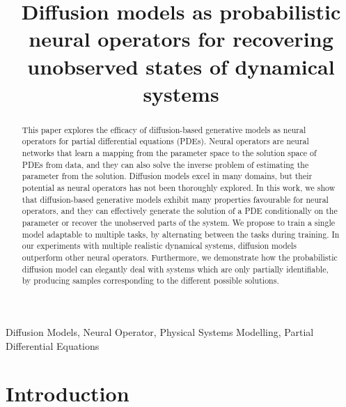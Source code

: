 \documentclass{article}
\title{Diffusion models as probabilistic neural operators for recovering unobserved states of dynamical systems}
\begin{document}
\maketitle

\begin{abstract}

This paper explores the efficacy of diffusion-based generative models as neural operators for partial differential equations (PDEs). Neural operators are neural networks that learn a mapping from the parameter space to the solution space of PDEs from data, and they can also solve the inverse problem of estimating the parameter from the solution. Diffusion models excel in many domains, but their potential as neural operators has not been thoroughly explored. In this work, we show that diffusion-based generative models exhibit many properties favourable for neural operators, and they can effectively generate the solution of a PDE conditionally on the parameter or recover the unobserved parts of the system. We propose to train a single model adaptable to multiple tasks, by alternating between the tasks during training. In our experiments with multiple realistic dynamical systems, diffusion models outperform other neural operators. Furthermore, we demonstrate how the probabilistic diffusion model can elegantly deal with systems which are only partially identifiable, by producing samples corresponding to the different possible solutions. 

\end{abstract}
\begin{keywords}
Diffusion Models, Neural Operator, Physical Systems Modelling, Partial Differential Equations
\end{keywords}
\section{Introduction}
\label{sec:intro}
\end{document}
